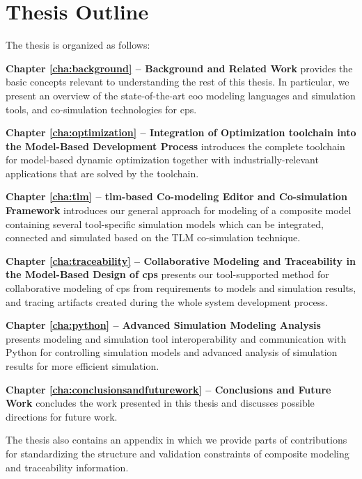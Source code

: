 \section{Thesis Outline}
\label{sec:Thesis Outline}

The thesis is organized as follows:

\begin{description}
	
\item \textbf{Chapter \ref{cha:background} – Background and Related Work } provides the basic concepts relevant to understanding the rest of this thesis. In particular, we present an overview of the state-of-the-art \acrshort{eoo} modeling languages and simulation tools, and co-simulation technologies for \acrshort{cps}. 

\item \textbf{Chapter \ref{cha:optimization} – Integration of Optimization toolchain into the Model-Based Development Process} introduces the complete toolchain for model-based dynamic optimization together with industrially-relevant applications that are solved by the toolchain.

\item \textbf{Chapter \ref{cha:tlm} – \acrshort{tlm}-based Co-modeling Editor and Co-simulation Framework} introduces our general approach for modeling of a composite model containing several tool-specific simulation models which can be integrated, connected and simulated based on the TLM co-simulation technique.

\item \textbf{Chapter \ref{cha:traceability} – Collaborative Modeling and Traceability in the Model-Based Design of \acrshort{cps}} presents our tool-supported method for collaborative modeling of \acrshort{cps} from requirements to models and simulation results, and tracing artifacts created during the whole system development process. 

\item \textbf{Chapter \ref{cha:python} – Advanced Simulation Modeling Analysis} presents modeling and simulation tool interoperability and communication with Python for controlling simulation models and advanced analysis of simulation results for more efficient simulation.

\item \textbf{Chapter \ref{cha:conclusionsandfuturework} – Conclusions and Future Work} concludes the work presented in this thesis and discusses possible directions for future work.

\end{description}

The thesis also contains an appendix in which we provide parts of contributions for standardizing the structure and validation constraints of composite modeling and traceability information.





